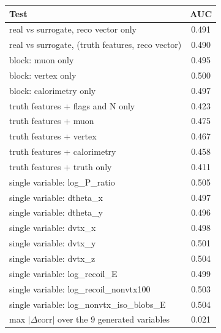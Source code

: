 \begin{tabular}{lc}
\toprule
Test & AUC \\
\midrule
real vs surrogate, reco vector only & 0.491 \\
real vs surrogate, (truth features, reco vector) & 0.490 \\
\midrule
block: muon only & 0.495 \\
block: vertex only & 0.500 \\
block: calorimetry only & 0.497 \\
truth features + flags and N only & 0.423 \\
truth features + muon & 0.475 \\
truth features + vertex & 0.467 \\
truth features + calorimetry & 0.458 \\
truth features + truth only & 0.411 \\
single variable: log\_P\_ratio & 0.505 \\
single variable: dtheta\_x & 0.497 \\
single variable: dtheta\_y & 0.496 \\
single variable: dvtx\_x & 0.498 \\
single variable: dvtx\_y & 0.501 \\
single variable: dvtx\_z & 0.504 \\
single variable: log\_recoil\_E & 0.499 \\
single variable: log\_recoil\_nonvtx100 & 0.503 \\
single variable: log\_nonvtx\_iso\_blobs\_E & 0.504 \\
\midrule
max $|\Delta$corr$|$ over the 9 generated variables & 0.021 \\
\bottomrule
\end{tabular}
